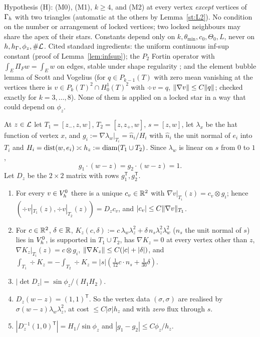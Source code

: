 Hypothesis (H): (M0), (M1), $k\ge4$, and (M2) at every vertex \emph{except} vertices of $\Gamma_h$ with two triangles (automatic at the others by Lemma~\ref{st:L2}). No condition on the number or arrangement of locked vertices; two locked neighbours may share the apex of their stars. Constants depend only on $k,\theta_{\min},c_0,\Theta_0,L$, never on $h,h_\Gamma,\phi_z,\#\mathcal L$. Cited standard ingredients: the uniform continuous inf-sup constant (proof of Lemma~\ref{lem:infsup}); the $P_2$ Fortin operator with $\int_E\Pi_Fw=\int_Ew$ on edges, stable under shape regularity \cite{GiraultRaviart}; and the element bubble lemma of Scott and Vogelius \cite{ScottVogelius1985} (for $q\in P_{k-1}(T)$ with zero mean vanishing at the vertices there is $v\in P_k(T)^2\cap H^1_0(T)^2$ with $\div v=q$, $\lVert \nabla v\rVert\le C\lVert q\rVert$; checked exactly for $k=3,\dots,8$). None of them is applied on a locked star in a way that could depend on $\phi_z$.

At $z\in\mathcal L$ let $T_1=[z_-,z,w]$, $T_2=[z,z_+,w]$, $s=[z,w]$, let $\lambda_x$ be the hat function of vertex $x$, and $g_i:=\nabla\lambda_w|_{T_i}=\hat n_i/H_i$ with $\hat n_i$ the unit normal of $e_i$ into $T_i$ and $H_i=\operatorname{dist}(w,e_i)\asymp h_z:=\operatorname{diam}(T_1\cup T_2)$. Since $\lambda_w$ is linear on $s$ from $0$ to $1$,
\begin{equation}\label{st:gs}
g_1\cdot(w-z)=g_2\cdot(w-z)=1 .
\end{equation}
Let $D_z$ be the $2\times2$ matrix with rows $g_1^{\mathsf T},g_2^{\mathsf T}$.

\begin{lemma}\label{st:K}
\begin{enumerate}[label=(\alph*)]
\item For every $v\in V_h^0$ there is a unique $c_v\in\mathbb R^2$ with $\nabla v|_{T_i}(z)=c_v\otimes g_i$; hence $(\div v|_{T_1}(z),\div v|_{T_2}(z))=D_zc_v$, and $|c_v|\le C\lVert \nabla v\rVert_{T_1}$.
\item For $c\in\mathbb R^2$, $\delta\in\mathbb R$, $K_z(c,\delta):=c\,\lambda_w\lambda_z^2+\delta\,n_s\lambda_z^2\lambda_w^2$ ($n_s$ the unit normal of $s$) lies in $V_h^0$, is supported in $T_1\cup T_2$, has $\nabla K_z=0$ at every vertex other than $z$, $\nabla K_z|_{T_i}(z)=c\otimes g_i$, $\lVert \nabla K_z\rVert\le C(|c|+|\delta|)$, and $\int_{T_1}\div K_z=-\int_{T_2}\div K_z=|s|(\frac1{12}c\cdot n_s+\frac1{30}\delta)$.
\item $|\det D_z|=\sin\phi_z/(H_1H_2)$.
\item $D_z(w-z)=(1,1)^{\mathsf T}$. So the vertex data $(\sigma,\sigma)$ are realised by $\sigma(w-z)\lambda_w\lambda_z^2$, at cost $\le C|\sigma|h_z$ and with \emph{zero} flux through $s$.
\item $|D_z^{-1}(1,0)^{\mathsf T}|=H_1/\sin\phi_z$ and $|g_1-g_2|\le C\phi_z/h_z$.
\end{enumerate}
\end{lemma}

